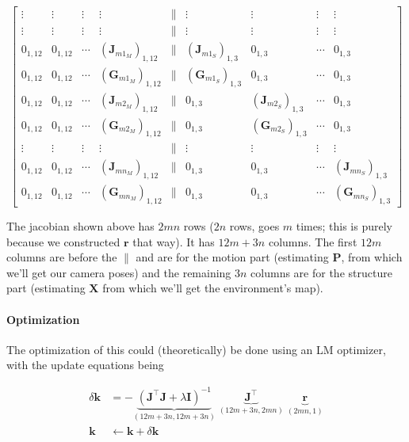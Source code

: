 \begin{equation}
\begin{bmatrix}
        \vdots & \vdots & \vdots & \vdots & \parallel & \vdots & \vdots & \vdots & \vdots \\
        \vdots & \vdots & \vdots & \vdots & \parallel & \vdots & \vdots & \vdots & \vdots \\
        
        0_{1,12} & 0_{1,12} & \cdots & (\mathbf{J}_{m1_M})_{1,12} & \parallel & (\mathbf{J}_{m1_S})_{1,3} & 0_{1,3} & \cdots & 0_{1,3} \\
        0_{1,12} & 0_{1,12} & \cdots & (\mathbf{G}_{m1_M})_{1,12} & \parallel & (\mathbf{G}_{m1_S})_{1,3} & 0_{1,3} & \cdots & 0_{1,3} \\
        0_{1,12} & 0_{1,12} & \cdots & (\mathbf{J}_{m2_M})_{1,12} & \parallel & 0_{1,3} & (\mathbf{J}_{m2_S})_{1,3} & \cdots & 0_{1,3} \\
        0_{1,12} & 0_{1,12} & \cdots & (\mathbf{G}_{m2_M})_{1,12} & \parallel & 0_{1,3} & (\mathbf{G}_{m2_S})_{1,3} & \cdots & 0_{1,3} \\
        \vdots & \vdots & \vdots & \vdots & \parallel & \vdots & \vdots & \vdots & \vdots \\
        0_{1,12} & 0_{1,12} & \cdots & (\mathbf{J}_{mn_M})_{1,12} & \parallel & 0_{1,3} & 0_{1,3} & \cdots & (\mathbf{J}_{mn_S})_{1,3} \\
        0_{1,12} & 0_{1,12} & \cdots & (\mathbf{G}_{mn_M})_{1,12} & \parallel & 0_{1,3} & 0_{1,3} & \cdots & (\mathbf{G}_{mn_S})_{1,3}      
        \end{bmatrix}
\end{equation}

The jacobian shown above has $2mn$ rows ($2n$ rows, goes $m$ times; this is purely because we constructed $\mathbf{r}$ that way). It has $12m+3n$ columns. The first $12m$ columns are before the $\parallel$ and are for the motion part (estimating $\mathbf{P}$, from which we'll get our camera poses) and the remaining $3n$ columns are for the structure part (estimating $\mathbf{X}$ from which we'll get the environment's map).

\paragraph*{Optimization}

The optimization of this could (theoretically) be done using an LM optimizer, with the update equations being

\begin{align}
    \delta \mathbf{k} &= - \underbrace{\left ( \mathbf{J^\top J} + \lambda \mathbf{I} \right )^{-1}}_{(12m+3n, 12m+3n)} \; \underbrace{\mathbf{J^\top}}_{(12m+3n, 2mn)} \; \underbrace{\mathbf{r}}_{(2mn, 1)}
    \nonumber \\
    \mathbf{k} &\leftarrow \mathbf{k} + \delta \mathbf{k}
\end{align}

